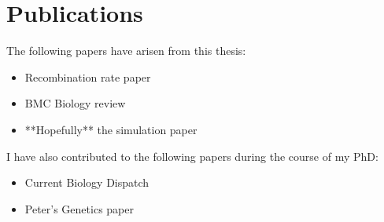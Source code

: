 \chapter{Publications}

The following papers have arisen from this thesis:
\begin{itemize}
  \item Recombination rate paper
  \item BMC Biology review
  \item **Hopefully** the simulation paper
\end{itemize}

I have also contributed to the following papers during the course of my PhD:
\begin{itemize}
  \item Current Biology Dispatch
  \item Peter's Genetics paper
\end{itemize}
